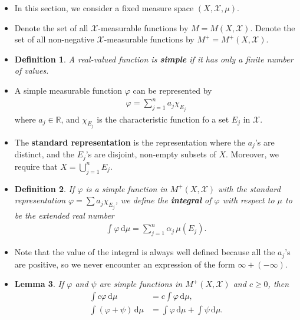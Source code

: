 \documentclass[10pt]{article}
\newtheorem{lemma}{Lemma}
\newtheorem{definition}[lemma]{Definition}
\newcommand{\dee}{\mathrm{d}}
\newcommand{\mcal}[1]{\mathcal{#1}}
\newcommand{\Real}{\mathbb{R}}
\begin{document}
\begin{itemize}
  \item In this section, we consider a fixed measure space $(X, \mcal{X}, \mu)$.
  
  \item Denote the set of all $\mcal{X}$-measurable functions by $M = M(X,\mcal{X})$. Denote the set of all non-negative $\mcal{X}$-measurable functions by $M^+ = M^+(X,\mcal{X})$.
  
  \item \begin{definition}
    A real-valued function is {\bf simple} if it has only a finite number of values.
  \end{definition}

  \item A simple measurable function $\varphi$ can be represented by
  \begin{align*}
    \varphi = \sum_{j=1}^n a_j \chi_{E_j}
  \end{align*}
  where $a_j \in \Real$, and $\chi_{E_j}$ is the characteristic function fo a set $E_j$ in $\mcal{X}$.

  \item The {\bf standard representation} is the representation where the $a_j$'s are distinct, and the $E_j$'s are disjoint, non-empty subsets of $X$. Moreover, we require that $X = \bigcup_{j=1}^n E_j$.

  \item \begin{definition}
    If $\varphi$ is a simple function in $M^+(X,\mcal{X})$ with the standard representation $\varphi = \sum a_j \chi_{E_j}$, we define the {\bf integral} of $\varphi$ with respect to $\mu$ to be the extended real number
    \begin{align*}
      \int \varphi\, \dee\mu = \sum_{j=1}^n \alpha_j\, \mu(E_j).
    \end{align*}
  \end{definition}  

  \item Note that the value of the integral is always well defined because all the $a_j$'s are positive, so we never encounter an expression of the form $\infty + (-\infty)$.
  
  \item \begin{lemma}
    If $\varphi$ and $\psi$ are simple functions in $M^+(X,\mcal{X})$ and $c \geq 0$, then
    \begin{align*}
      \int c\varphi\, \dee\mu &= c \int \varphi\, \dee\mu, \\
      \int (\varphi + \psi) \, \dee\mu &= \int \varphi\, \dee\mu + \int \psi\, \dee\mu.
    \end{align*}
  \end{lemma}


\end{itemize}
\end{document}
